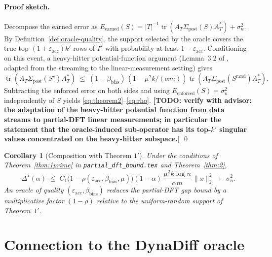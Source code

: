 \documentclass[11pt]{article}
\newcommand{\todomark}[1]{\textbf{[TODO: #1]}}
\newtheorem{corollary}[theorem]{Corollary}
\theoremstyle{remark}
\begin{document}
\paragraph*{Proof sketch.}
Decompose the earned error as
$E_{\mathrm{earned}}(S) = |T|^{-1}\operatorname{tr}(A_T \Sigma_{\mathrm{post}}(S) A_T^{\!*}) + \sigma_n^2$.
By Definition~\ref{def:oracle-quality}, the support selected by the
oracle covers the true top-$(1+\varepsilon_{\mathrm{acc}})k'$ rows of
$I^\star$ with probability at least $1-\varepsilon_{\mathrm{acc}}$.
Conditioning on this event, a heavy-hitter potential-function argument
(Lemma~3.2 of \cite{AamandIndykSilwalVakilian2025}, adapted from the
streaming to the linear-measurement setting) gives
\begin{equation*}
    \operatorname{tr}(A_T \Sigma_{\mathrm{post}}(S^\star) A_T^{\!*})
    \;\leq\; (1-\beta_{\mathrm{bias}})\,(1-\mu^2 k/(\alpha m))
    \operatorname{tr}(A_T \Sigma_{\mathrm{post}}(S^{\mathrm{rand}}) A_T^{\!*}).
\end{equation*}
Subtracting the enforced error on both sides and using
$E_{\mathrm{enforced}}(S) = \sigma_n^2$ independently of $S$ yields
\eqref{eq:theorem2}--\eqref{eq:rho}. \todomark{verify with advisor: the
adaptation of the heavy-hitter potential function from data streams to
partial-DFT linear measurements; in particular the statement that the
oracle-induced sub-operator has its top-$k'$ singular values
concentrated on the heavy-hitter subspace.} \qed

\begin{corollary}[Composition with Theorem $1'$]\label{cor:composition}
Under the conditions of Theorem~\ref{thm:1prime} in
\texttt{partial\_dft\_bound.tex} and
Theorem~\ref{thm:2},
\begin{equation}
    \Delta^\star(\alpha) \;\leq\;
    C_1 \big(1-\rho(\varepsilon_{\mathrm{acc}},\beta_{\mathrm{bias}},\mu)\big)
    (1-\alpha)\,\frac{\mu^2 k \log n}{\alpha m}\,\|x\|_2^2 \;+\; \sigma_n^2.
\end{equation}
An oracle of quality $(\varepsilon_{\mathrm{acc}},\beta_{\mathrm{bias}})$
reduces the partial-DFT gap bound by a multiplicative factor
$(1-\rho)$ relative to the uniform-random support of Theorem~$1'$.
\end{corollary}

\section*{Connection to the DynaDiff oracle}
\end{document}
